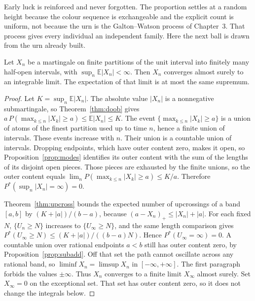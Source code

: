 Early luck is reinforced and never forgotten. The proportion settles at a random height because the colour sequence is exchangeable and the explicit count is uniform, not because the urn is the Galton--Watson process of Chapter~3. That process gives every individual an independent family. Here the next ball is drawn from the urn already built.

\begin{theorem}\label{thm:asconv}
Let $X_n$ be a martingale on finite partitions of the unit interval into finitely many half-open intervals, with $\sup_n\mathbb E|X_n|<\infty$. Then $X_n$ converges almost surely to an integrable limit. The expectation of that limit is at most the same supremum.
\end{theorem}
\begin{proof}
Let $K=\sup_n\mathbb E|X_n|$. The absolute value $|X_n|$ is a nonnegative submartingale, so Theorem~\ref{thm:doob} gives $a\,P(\max_{k\le n}|X_k|\ge a)\le\mathbb E|X_n|\le K$. The event $\{\max_{k\le n}|X_k|\ge a\}$ is a union of atoms of the finest partition used up to time $n$, hence a finite union of intervals. These events increase with $n$. Their union is a countable union of intervals. Dropping endpoints, which have outer content zero, makes it open, so Proposition~\ref{prop:modes} identifies its outer content with the sum of the lengths of its disjoint open pieces. Those pieces are exhausted by the finite unions, so the outer content equals $\lim_n P(\max_{k\le n}|X_k|\ge a)\le K/a$. Therefore $P^*(\sup_n|X_n|=\infty)=0$.

Theorem~\ref{thm:upcross} bounds the expected number of upcrossings of a band $[a,b]$ by $(K+|a|)/(b-a)$, because $(a-X_n)_+\le|X_n|+|a|$. For each fixed $N$, $\{U_n\ge N\}$ increases to $\{U_\infty\ge N\}$, and the same length comparison gives $P^*(U_\infty\ge N)\le(K+|a|)/((b-a)N)$. Hence $P^*(U_\infty=\infty)=0$. A countable union over rational endpoints $a<b$ still has outer content zero, by Proposition~\ref{prop:subadd}. Off that set the path cannot oscillate across any rational band, so $\liminf X_n=\limsup X_n$ in $[-\infty,+\infty]$. The first paragraph forbids the values $\pm\infty$. Thus $X_n$ converges to a finite limit $X_\infty$ almost surely. Set $X_\infty=0$ on the exceptional set. That set has outer content zero, so it does not change the integrals below.


\end{proof}
